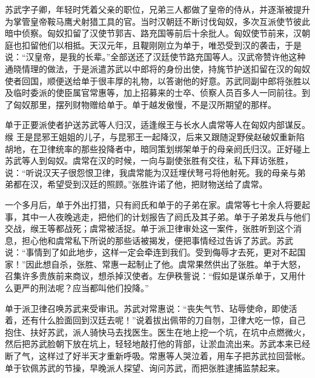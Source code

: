 \documentclass[12pt,UTF-8,openany]{ctexbook}
\begin{document}
\begin{normalsize}
    
    苏武字子卿，年轻时凭着父亲的职位，兄弟三人都做了皇帝的侍从，并逐渐被提升为掌管皇帝鞍马鹰犬射猎工具的官。当时汉朝廷不断讨伐匈奴，多次互派使节彼此暗中侦察。匈奴扣留了汉使节郭吉、路充国等前后十余批人。匈奴使节前来，汉朝庭也扣留他们以相抵。天汉元年，且鞮刚刚立为单于，唯恐受到汉的袭击，于是说：“汉皇帝，是我的长辈。”全部送还了汉廷使节路充国等人。汉武帝赞许他这种通晓情理的做法，于是派遣苏武以中郎将的身份出使，持旄节护送扣留在汉的匈奴使者回国，顺便送给单于很丰厚的礼物，以答谢他的好意。苏武同副中郎将张胜以及临时委派的使臣属官常惠等，加上招募来的士卒、侦察人员百多人一同前往。到了匈奴那里，摆列财物赠给单于。单于越发傲慢，不是汉所期望的那样。
    
    单于正要派使者护送苏武等人归汉，适逢缑王与长水人虞常等人在匈奴内部谋反。缑 王是昆邪王姐姐的儿子，与昆邪王一起降汉，后来又跟随浞野侯赵破奴重新陷胡地，在卫律统率的那些投降者中，暗同策划绑架单于的母亲阏氏归汉。正好碰上苏武等人到匈奴。虞常在汉的时候，一向与副使张胜有交往，私下拜访张胜，说：“听说汉天子很怨恨卫律，我虞常能为汉廷埋伏弩弓将他射死。我的母亲与弟弟都在汉，希望受到汉廷的照顾。”张胜许诺了他，把财物送给了虞常。
    
    一个多月后，单于外出打猎，只有阏氏和单于的子弟在家。虞常等七十余人将要起事，其中一人夜晚逃走，把他们的计划报告了阏氏及其子弟。单于子弟发兵与他们交战，缑王等都战死；虞常被活捉。单于派卫律审处这一案件，张胜听到这个消息，担心他和虞常私下所说的那些话被揭发，便把事情经过告诉了苏武。苏武说：“事情到了如此地步，这样一定会牵连到我们。受到侮辱才去死，更对不起国家！”因此想自杀，张胜、常惠一起制止了他。虞常果然供出了张胜。单于大怒，召集许多贵族前来商议，想杀掉汉使者。左伊秩訾说：“假如是谋杀单于，又用什么更严的刑法呢？应当都叫他们投降。”
    
    单于派卫律召唤苏武来受审讯。苏武对常惠说：“丧失气节、玷辱使命，即使活着，还有什么脸面回到汉廷去呢！”说着拔出佩带的刀自刎，卫律大吃一惊，自己抱住、扶好苏武，派人骑快马去找医生。医生在地上挖一个坑，在坑中点燃微火，然后把苏武脸朝下放在坑上，轻轻地敲打他的背部，让淤血流出来。苏武本来已经断了气，这样过了好半天才重新呼吸。常惠等人哭泣着，用车子把苏武拉回营帐。单于钦佩苏武的节操，早晚派人探望、询问苏武，而把张胜逮捕监禁起来。
    

\end{normalsize}
\end{document}
